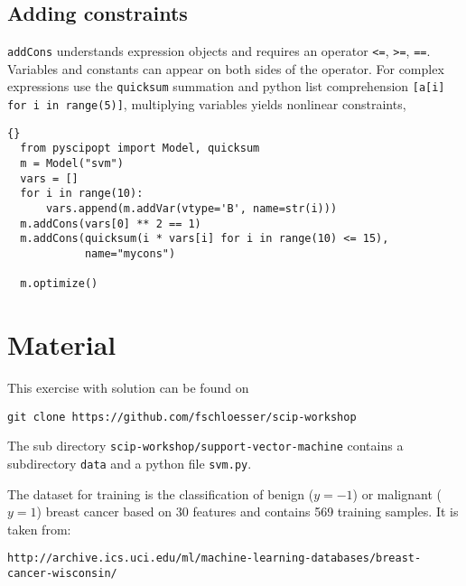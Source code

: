 \documentclass[11pt]{article}
\newcommand\ttt\texttt
\begin{document}
\subsection*{Adding constraints}

\ttt{addCons} understands expression objects and requires an operator \ttt{<=}, \ttt{>=}, \ttt{==}. Variables and constants can appear on both sides of the operator.
For complex expressions use the \ttt{quicksum} summation and python list comprehension \ttt{[a[i] for i in range(5)]}, multiplying variables yields nonlinear constraints,

\begin{lstlisting}[frame=tb]{}
  from pyscipopt import Model, quicksum
  m = Model("svm")
  vars = []
  for i in range(10):
      vars.append(m.addVar(vtype='B', name=str(i)))
  m.addCons(vars[0] ** 2 == 1)
  m.addCons(quicksum(i * vars[i] for i in range(10) <= 15),
            name="mycons")

  m.optimize()
\end{lstlisting}


\section*{Material}

This exercise with solution can be found on
\begin{center}
  \ttt{git clone https://github.com/fschloesser/scip-workshop}
\end{center}

The sub directory \ttt{scip-workshop/support-vector-machine} contains a subdirectory \ttt{data} and a python file \ttt{svm.py}.

The dataset for training is the classification of benign ($y=-1$) or malignant ($y=1$) breast cancer based on 30 features and contains 569 training samples.
It is taken from:

\begin{center}
  \ttt{\footnotesize http://archive.ics.uci.edu/ml/machine-learning-databases/breast-cancer-wisconsin/}
\end{center}
\end{document}

